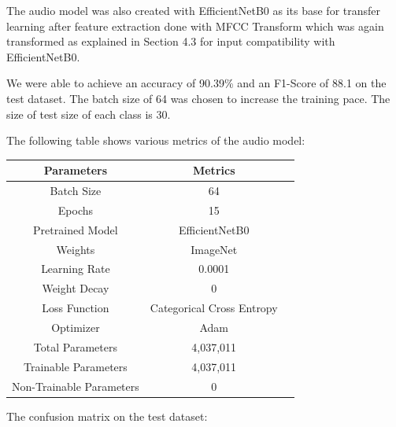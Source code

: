\documentclass[fleqn, 10pt, twoside]{IOEGC}
\begin{document}
The audio model was also created with EfficientNetB0 as its base for transfer learning after feature extraction done with MFCC Transform which was again transformed as explained in Section 4.3 for input compatibility with EfficientNetB0.
\par
We were able to achieve an accuracy of 90.39\% and an F1-Score of 88.1 on the test dataset. The batch size of 64 was chosen to increase the training pace. The size of test size of each class is 30.
\par
The following table shows various metrics of the audio model:
\vspace{3cm}

\begin{center}
	\begin{tabular}{ |c|c|c| }
		\hline
		\textbf{Parameters}      & \textbf{Metrics}          \\
		\hline
		Batch Size               & 64                        \\
		\hline
		Epochs                   & 15                        \\
		\hline
		Pretrained Model         & EfficientNetB0            \\
		\hline
		Weights                  & ImageNet                  \\
		\hline
		Learning Rate            & 0.0001                    \\
		\hline
		Weight Decay             & 0                         \\
		\hline
		Loss Function            & Categorical Cross Entropy \\
		\hline
		Optimizer                & Adam                      \\
		\hline
		Total Parameters         & 4,037,011                 \\
		\hline
		Trainable Parameters     & 4,037,011                 \\
		\hline
		Non-Trainable Parameters & 0                         \\
		\hline
	\end{tabular}

\end{center}
\clearpage
The confusion matrix on the test dataset:
\end{document}
